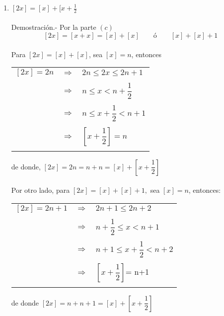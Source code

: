 \begin{enumerate}[ \bfseries 1.]
\begin{enumerate}[\bfseries (a)]
	    \item  $[2x] = [x] + [x + \frac{1}{2}$\\\\
		Demostración.-\; Por la parte $(c)$  $$[2x]=[x+x] = [x] + [x] \qquad ó \qquad [x]+[x]+1$$ \\
		Para $[2x] = [x] + [x]$, sea $[x]=n$, entonces 
		\begin{center}
		    \begin{tabular}{rcl}
			$[2x]=2n$&$\Longrightarrow$&$2n\leq 2x \leq 2n+1$\\\\
			&$\Longrightarrow$&$n\leq x < n + \dfrac{1}{2}$\\\\
			&$\Longrightarrow$&$n \leq x + \dfrac{1}{2}<n+1$\\\\
			&$\Longrightarrow$&$\left[x + \dfrac{1}{2}\right] = n$\\\\
		    \end{tabular}
		\end{center}
		de donde, $[2x]=2n=n+n=[x]+\left[x + \dfrac{1}{2}\right]$\\\\

		Por otro lado, para $[2x] = [x] + [x] + 1,$ sea $[x]=n$, entonces:
		\begin{center}
		    \begin{tabular}{rcl}
			$[2x]=2n+1$&$\Longrightarrow$&$2n+1 \leq 2n + 2$\\\\
			&$\Longrightarrow$&$n+\dfrac{1}{2}\leq x < n+1$\\\\
			&$\Longrightarrow$&$n+1 \leq x+\dfrac{1}{2} < n+2$\\\\
			&$\Longrightarrow$&$\left[x+ \dfrac{1}{2}\right]$= n+1\\\\
		    \end{tabular}
		\end{center}
		de donde $[2x]=n+n+1=[x]+\left[x+\dfrac{1}{2}\right]$\\\\


\end{enumerate}
\end{enumerate}
